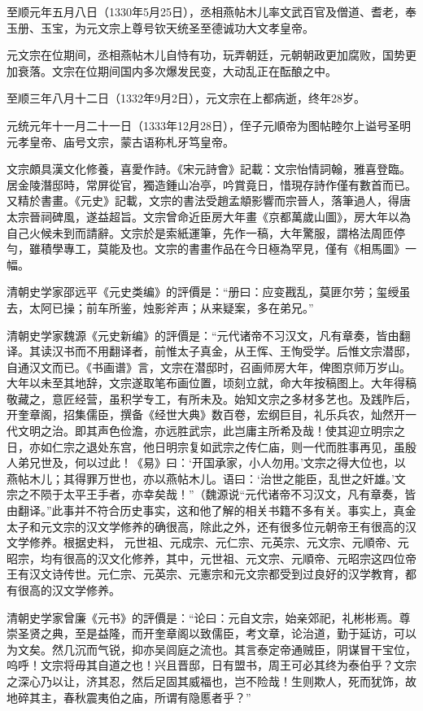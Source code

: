 至顺元年五月八日（1330年5月25日），丞相燕帖木儿率文武百官及僧道、耆老，奉玉册、玉宝，为元文宗上尊号钦天统圣至德诚功大文孝皇帝。

元文宗在位期间，丞相燕帖木儿自恃有功，玩弄朝廷，元朝朝政更加腐败，国势更加衰落。文宗在位期间国内多次爆发民变，大动乱正在酝酿之中。

至顺三年八月十二日（1332年9月2日），元文宗在上都病逝，终年28岁。

元统元年十一月二十一日（1333年12月28日），侄子元順帝为图帖睦尔上谥号圣明元孝皇帝、庙号文宗，蒙古语称札牙笃皇帝。

文宗頗具漢文化修養，喜愛作詩。《宋元詩會》記載：文宗怡情詞翰，雅喜登臨。居金陵潛邸時，常屏從官，獨造鍾山冶亭，吟賞竟日，惜現存詩作僅有數首而已。又精於書畫。《元史》記載，文宗的書法受趙孟頫影響而宗晉人，落筆過人，得唐太宗晉祠碑風，遂益超旨。文宗曾命近臣房大年畫《京都萬歲山圖》，房大年以為自己火候未到而請辭。文宗於是索紙運筆，先作一稿，大年驚服，謂格法周匝停勻，雖積學專工，莫能及也。文宗的書畫作品在今日極為罕見，僅有《相馬圖》一幅。

清朝史学家邵远平《元史类编》的評價是：“册曰：应变戡乱，莫匪尔劳；玺绶虽去，太阿已操；前车所鉴，烛影斧声；从来疑案，多在弟兄。”

清朝史学家魏源《元史新编》的評價是：“元代诸帝不习汉文，凡有章奏，皆由翻译。其读汉书而不用翻译者，前惟太子真金，从王恽、王恂受学。后惟文宗潜邸，自通汉文而已。《书画谱》言，文宗在潜邸时，召画师房大年，俾图京师万岁山。大年以未至其地辞，文宗遂取笔布画位置，顷刻立就，命大年按稿图上。大年得稿敬藏之，意匠经营，虽积学专工，有所未及。始知文宗之多材多艺也。及践阼后，开奎章阁，招集儒臣，撰备《经世大典》数百卷，宏纲巨目，礼乐兵农，灿然开一代文明之治。即其声色俭澹，亦远胜武宗，此岂庸主所希及哉！使其迎立明宗之日，亦如仁宗之退处东宫，他日明宗复如武宗之传仁庙，则一代而胜事再见，虽殷人弟兄世及，何以过此！《易》曰：‘开国承家，小人勿用。’文宗之得大位也，以燕帖木儿；其得罪万世也，亦以燕帖木儿。语曰：‘治世之能臣，乱世之奸雄。’文宗之不陨于太平王手者，亦幸矣哉！”（魏源说“元代诸帝不习汉文，凡有章奏，皆由翻译。”此事并不符合历史事实，这和他了解的相关书籍不多有关。事实上，真金太子和元文宗的汉文学修养的确很高，除此之外，还有很多位元朝帝王有很高的汉文学修养。根据史料， 元世祖、元成宗、元仁宗、元英宗、元文宗、元順帝、元昭宗，均有很高的汉文化修养，其中，元世祖、元文宗、元順帝、元昭宗这四位帝王有汉文诗传世。元仁宗、元英宗、元憲宗和元文宗都受到过良好的汉学教育，都有很高的汉文学修养。

清朝史学家曾廉《元书》的評價是：“论曰：元自文宗，始亲郊祀，礼彬彬焉。尊崇圣贤之典，至是益隆，而开奎章阁以致儒臣，考文章，论治道，勤于延访，可以为文矣。然几沉而气锐，抑亦吴闾庭之流也。其言泰定帝通贼臣，阴谋冒干宝位，呜呼！文宗将毋其自道之也！兴且晋邸，日有盟书，周王可必其终为泰伯乎？文宗之深心乃以让，济其忍，然后足固其威福也，岂不险哉！生则欺人，死而犹饰，故地碎其主，春秋震夷伯之庙，所谓有隐慝者乎？”

